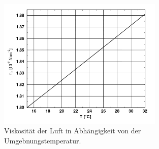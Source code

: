 \begin{figure}[h]
	\centering
	\includegraphics[width=0.7\textwidth]{Bilder/Temp.png}
	\caption{Viskosität der Luft in Abhängigkeit von der Umgebnungstemperatur. \cite{skript}}
	\label{fig:temp}
\end{figure}



